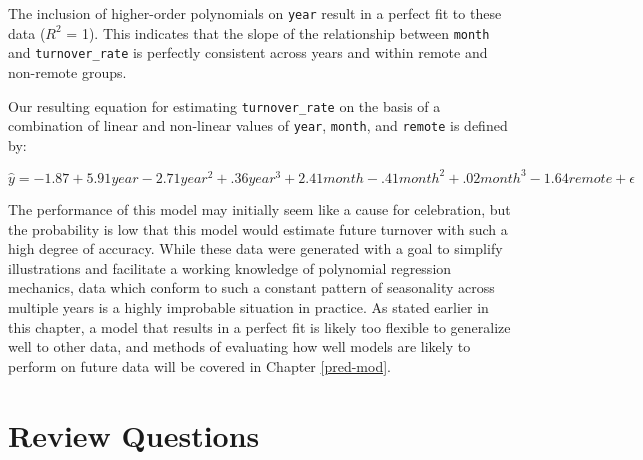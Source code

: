 \documentclass[
]{book}
\begin{document}
The inclusion of higher-order polynomials on \texttt{year} result in a perfect fit to these data (\(R^2\) = 1). This indicates that the slope of the relationship between \texttt{month} and \texttt{turnover\_rate} is perfectly consistent across years and within remote and non-remote groups.

Our resulting equation for estimating \texttt{turnover\_rate} on the basis of a combination of linear and non-linear values of \texttt{year}, \texttt{month}, and \texttt{remote} is defined by:

\[ \hat y = -1.87 + 5.91year - 2.71year^2 + .36year^3 + 2.41month - .41month^2 + .02month^3 - 1.64remote + \epsilon \]

The performance of this model may initially seem like a cause for celebration, but the probability is low that this model would estimate future turnover with such a high degree of accuracy. While these data were generated with a goal to simplify illustrations and facilitate a working knowledge of polynomial regression mechanics, data which conform to such a constant pattern of seasonality across multiple years is a highly improbable situation in practice. As stated earlier in this chapter, a model that results in a perfect fit is likely too flexible to generalize well to other data, and methods of evaluating how well models are likely to perform on future data will be covered in Chapter \ref{pred-mod}.

\hypertarget{review-questions-9}{%
\section{Review Questions}\label{review-questions-9}}
\end{document}

